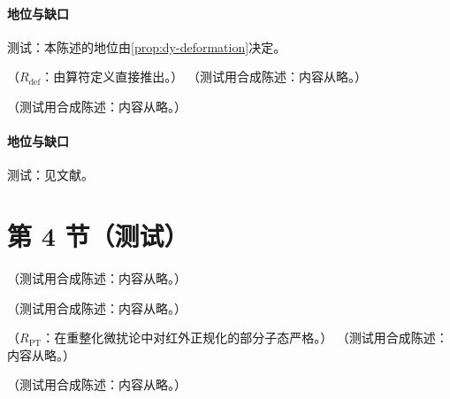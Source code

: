 \paragraph{地位与缺口}测试：本陈述的地位由\cref{prop:dy-deformation}决定。

\begin{proposition}\label{prop:dy-universality}
（$R_{\mathrm{def}}$：由算符定义直接推出。）
（测试用合成陈述：内容从略。）
\end{proposition}

\begin{proposition}\label{prop:dy-abelian-model}
（测试用合成陈述：内容从略。）
\end{proposition}
\paragraph{地位与缺口}测试：见文献。

\section{第 4 节（测试）}\label{sec:dy-glauber}

\begin{example}[旁观者模型的光锥序表示]\label{ex:dy-spectator-lcopt}
（测试用合成陈述：内容从略。）
\end{example}

\begin{example}\label{ex:dy-glauber-model}
（测试用合成陈述：内容从略。）
\end{example}

\begin{proposition}\label{prop:dy-eikonal-twogluon}
（$R_{\mathrm{PT}}$：在重整化微扰论中对红外正规化的部分子态严格。）
（测试用合成陈述：内容从略。）
\end{proposition}

\begin{remark}[共同时序是物理结果]\label{rem:dy-common-ordering}
（测试用合成陈述：内容从略。）
\end{remark}

